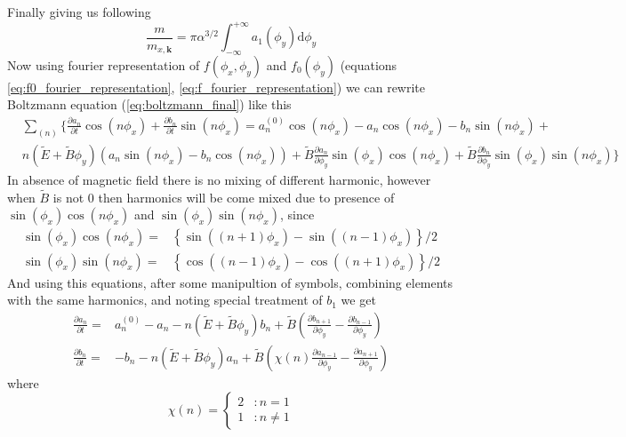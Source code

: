 \documentclass[40pt,letterpaper,physrev]{article}
\begin{document}
	Finally giving us following
	\begin{equation}
	\boxed{
		\frac{m}{m_{x,\mathbf{k}}}=\pi\alpha^{3/2}\int^{+\infty}_{-\infty} a_1(\phi_y)\text{d}\phi_y
		}
	\end{equation}
	Now using fourier representation of $f(\phi_x,\phi_y)$ and $f_0(\phi_y)$ (equations \ref{eq:f0_fourier_representation}, \ref{eq:f_fourier_representation}) we can rewrite Boltzmann equation (\ref{eq:boltzmann_final}) like this
	\begin{align}
	&\sum_{(n)}\bigg \{ \frac{\partial a_n}{\partial t}\cos(n\phi_x) + \frac{\partial b_n}{\partial t}\sin(n\phi_x) = a^{(0)}_{n}\cos(n\phi_x)-a_n\cos(n\phi_x)-b_n\sin(n\phi_x)+\nonumber \\
	&n(\tilde{E}+\tilde{B}\phi_y)(a_n\sin(n\phi_x)-b_n\cos(n\phi_x))+ \tilde{B}\frac{\partial a_n}{\partial\phi_y}\sin(\phi_x)\cos(n\phi_x) + \tilde{B}\frac{\partial b_n}{\partial\phi_y}\sin(\phi_x)\sin(n\phi_x)\bigg \}
	\end{align}
	In absence of magnetic field there is no mixing of different harmonic, however when $\tilde{B}$ is not $0$ then harmonics will be come mixed due to presence of $\sin(\phi_x)\cos(n\phi_x)$ and $\sin(\phi_x)\sin(n\phi_x)$, since
	\begin{align}
	\sin(\phi_x)\cos(n\phi_x)=&\left \{ \sin((n+1)\phi_x) -\sin((n-1)\phi_x) \right \}/2 \\
	\sin(\phi_x)\sin(n\phi_x)=&\left \{ \cos((n-1)\phi_x) -\cos((n+1)\phi_x) \right \}/2
	\end{align}
	And using this equations, after some manipultion of symbols,
	combining elements with the same harmonics, and noting special treatment of $b_1$ we get
	\begin{align}
		\frac{\partial a_n}{\partial t}=&a^{(0)}_n-a_n-n(\tilde{E}+\tilde{B}\phi_y)b_n+\tilde{B}\left ( \frac{\partial b_{n+1}}{\partial\phi_y}-\frac{\partial b_{n-1}}{\partial\phi_y} \right )\label{eq:a_n_dot} \\
		\frac{\partial b_n}{\partial t}=&-b_n-n(\tilde{E}+\tilde{B}\phi_y)a_n+\tilde{B}\left ( \chi(n)\frac{\partial a_{n-1}}{\partial\phi_y}-\frac{\partial a_{n+1}}{\partial\phi_y} \right ) \label{eq:b_n_dot}
	\end{align}
	where
	\begin{equation}
		\chi(n)=
		\begin{cases}
	   2 & : n= 1 \\
	   1 & : n\ne 1
	  \end{cases}
	\end{equation}
\end{document}
